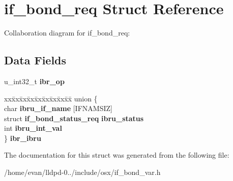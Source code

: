 \section{if\-\_\-bond\-\_\-req \-Struct \-Reference}
\label{structif__bond__req}


\-Collaboration diagram for if\-\_\-bond\-\_\-req\-:
\subsection*{\-Data \-Fields}
\begin{DoxyCompactItemize}
\item 
u\-\_\-int32\-\_\-t {\bfseries ibr\-\_\-op}\label{structif__bond__req_a8d2a7d26a4aa2f1f140c66ddd7a95c86}

\item 
\begin{tabbing}
xx\=xx\=xx\=xx\=xx\=xx\=xx\=xx\=xx\=\kill
union \{\\
\>char {\bfseries ibru\_if\_name} [IFNAMSIZ]\\
\>struct {\bf if\_bond\_status\_req} {\bfseries ibru\_status}\\
\>int {\bfseries ibru\_int\_val}\\
\} {\bfseries ibr\_ibru}\label{structif__bond__req_a3c177f9030cacf779ba04784f71ecfc0}
\\

\end{tabbing}\end{DoxyCompactItemize}


\-The documentation for this struct was generated from the following file\-:\begin{DoxyCompactItemize}
\item 
/home/evan/lldpd-\/0../include/osx/if\-\_\-bond\-\_\-var.\-h\end{DoxyCompactItemize}
